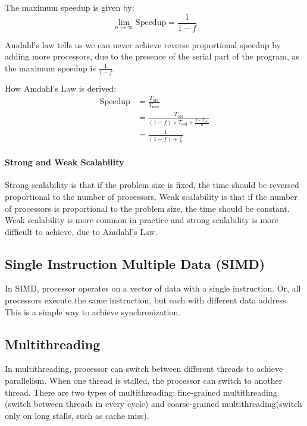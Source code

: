 \documentclass[a4paper,12pt]{article}
\begin{document}
The maximum speedup is given by:
\begin{equation*}
	\lim_{n \to \infty} \text{Speedup} = \frac{1}{1 - f}
\end{equation*}

Amdahl's law tells us we can never achieve reverse proportional speedup by adding more processors, due to the presence of the serial part of the program, as the maximum speedup is $\frac{1}{1 - f}$.

\begin{tipsbox}
	How Amdahl's Law is derived:
	\begin{align*}
		\text{Speedup} &= \frac{T_{\text{old}}}{T_{\text{new}}} \\
		&= \frac{T_{\text{old}}}{(1 - f) \times T_{\text{old}} + \frac{f \times T_{\text{old}}}{n}} \\
		&= \frac{1}{(1 - f) + \frac{f}{n}}
	\end{align*}
\end{tipsbox}

\paragraph{Strong and Weak Scalability} Strong scalability is that if the problem size is fixed, the time should be reversed proportional to the number of processors. Weak scalability is that if the number of processors is proportional to the problem size, the time should be constant. Weak scalability is more common in practice and strong scalability is more difficult to achieve, due to Amdahl's Law.

\subsection{Single Instruction Multiple Data (SIMD)}

In SIMD, processor operates on a vector of data with a single instruction. Or, all processors execute the same instruction, but each with different data address. This is a simple way to achieve synchronization.

\subsection{Multithreading}

In multithreading, processor can switch between different threads to achieve parallelism. When one thread is stalled, the processor can switch to another thread. There are two types of multithreading: fine-grained multithreading (switch between threads in every cycle) and coarse-grained multithreading(switch only on long stalls, such as cache miss).
\end{document}

